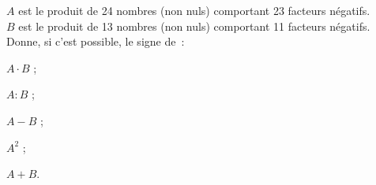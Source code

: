 \begin{exercice}[Signe]
$A$ est le produit de 24 nombres (non nuls) comportant 23 facteurs négatifs.\\[0.5em]
$B$ est le produit de 13 nombres (non nuls) comportant 11 facteurs négatifs.\\[0.5em] 
Donne, si c'est possible, le signe de :
\begin{colenumerate}{3}
 \item $A \cdot B$ ;
 \item $A : B$ ;
 \item $A - B$ ; 
 \item $A^{2}$ ;
 \item $A + B$.
 \end{colenumerate}           
\end{exercice}




